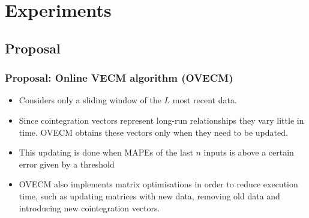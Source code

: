 \documentclass[xcolor=dvipsnames]{beamer}
\begin{document}
\section{Experiments}
\subsection{Proposal}
\begin{frame}
\frametitle{Proposal: Online VECM algorithm (OVECM)}
\begin{itemize}
\item Considers only a sliding window of the $L$ most recent data. 
\item Since cointegration vectors represent long-run relationships they vary
little in time. OVECM obtains these vectors only when they need to be updated. 
\item This updating is done when MAPEs of the last $n$ inputs is above a certain
error given by a threshold 
\item OVECM also implements matrix optimisations in order to reduce execution time,
such as updating matrices with new data, removing old data and introducing new
cointegration vectors.
\end{itemize}
\end{frame}
\end{document}
